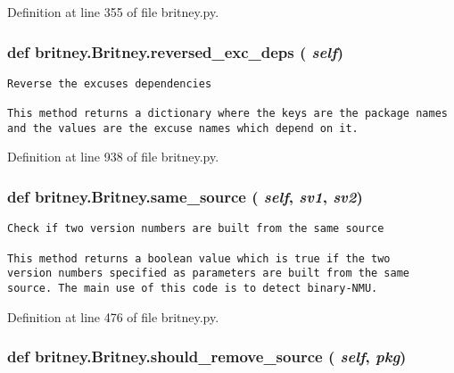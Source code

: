 Definition at line 355 of file britney.py.
\subsubsection{\setlength{\rightskip}{0pt plus 5cm}def britney.Britney.reversed\_\-exc\_\-deps ( {\em self})}\label{classbritney_1_1Britney_be1b4af9d6c6650c70b24267412bc1a8}




\footnotesize\begin{verbatim}Reverse the excuses dependencies

This method returns a dictionary where the keys are the package names
and the values are the excuse names which depend on it.
\end{verbatim}
\normalsize
 

Definition at line 938 of file britney.py.
\subsubsection{\setlength{\rightskip}{0pt plus 5cm}def britney.Britney.same\_\-source ( {\em self},  {\em sv1},  {\em sv2})}\label{classbritney_1_1Britney_85d2e45e8431779b62f398c34972ddf1}




\footnotesize\begin{verbatim}Check if two version numbers are built from the same source

This method returns a boolean value which is true if the two
version numbers specified as parameters are built from the same
source. The main use of this code is to detect binary-NMU.
\end{verbatim}
\normalsize
 

Definition at line 476 of file britney.py.
\subsubsection{\setlength{\rightskip}{0pt plus 5cm}def britney.Britney.should\_\-remove\_\-source ( {\em self},  {\em pkg})}\label{classbritney_1_1Britney_f8a6c9adbdec7a5a982dd2b74febcc08}




